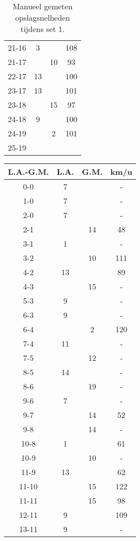\begin{table}[ht!]
\begin{tabular}{|c|c|c|c|}
    21-16 & 3 & & 108 \\
    21-17 & & 10 & 93 \\
    22-17 & 13 & & 100 \\
    23-17 & 13 & & 101 \\
    23-18 & & 15 & 97 \\
    24-18 & 9 & & 100 \\
    24-19 & & 2 & 101 \\
    25-19 & & & \\ \hline
  \end{tabular}
  \caption[Manueel gemeten opslagsnelheden tijdens set 1]{\label{tab:PL1ServeMan1}Manueel gemeten opslagsnelheden tijdens set 1.}
\end{table}

\begin{table}[ht!]
  \centering
  \scriptsize
  \begin{tabular}{|c|c|c|c|} \hline
    L.A.-G.M. & L.A. & G.M. & km/u \\ \hline
    0-0 & 7 & & - \\
    1-0 & 7 & & - \\
    2-0 & 7 & & - \\
    2-1 & & 14 & 48 \\
    3-1 & 1 & & - \\
    3-2 & & 10 & 111 \\
    4-2 & 13 & & 89 \\
    4-3 & & 15 & - \\
    5-3 & 9 & & - \\
    6-3 & 9 & & - \\
    6-4 & & 2 & 120 \\
    7-4 & 11 & & - \\
    7-5 & & 12 & - \\
    8-5 & 14 & & - \\
    8-6 & & 19 & - \\
    9-6 & 7 & & - \\
    9-7 & & 14 & 52 \\
    9-8 & & 14 & - \\
    10-8 & 1 & & 61 \\
    10-9 & & 10 & - \\
    11-9 & 13 & & 62 \\
    11-10 & & 15 & 122 \\
    11-11 & & 15 & 98 \\
    12-11 & 9 & & 109 \\
    13-11 & 9 & & - \\

\end{tabular}
\end{table}
